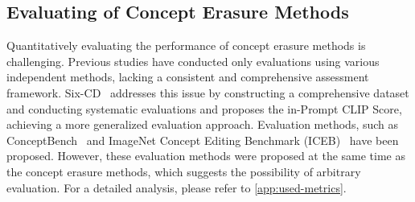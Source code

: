 \subsection{Evaluating of Concept Erasure Methods}
Quantitatively evaluating the performance of concept erasure methods is challenging. Previous studies have conducted only evaluations using various independent methods, lacking a consistent and comprehensive assessment framework. Six-CD~\cite{ren2024sixcdbenchmarkingconceptremovals} addresses this issue by constructing a comprehensive dataset and conducting systematic evaluations and proposes the in-Prompt CLIP Score, achieving a more generalized evaluation approach. 
Evaluation methods, such as ConceptBench~\cite{Zhang_2024_CVPR} and ImageNet Concept Editing Benchmark (ICEB)~\cite{xiong2024editingmassiveconceptstexttoimage} have been proposed. However, these evaluation methods were proposed at the same time as the concept erasure methods, which suggests the possibility of arbitrary evaluation. For a detailed analysis, please refer to \cref{app:used-metrics}.